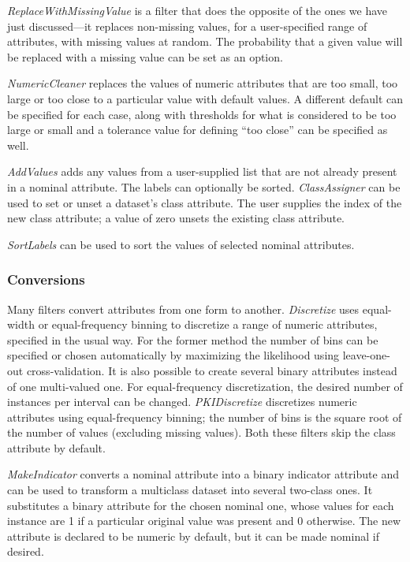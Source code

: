 \textit{ReplaceWithMissingValue} is a filter that does the opposite of
the ones we have just discussed---it replaces non-missing values, for a
user-specified range of attributes, with missing values at random. The
probability that a given value will be replaced with a missing value can
be set as an option.

\textit{NumericCleaner} replaces the values of numeric attributes that are too
small, too large or too close to a particular value with default
values. A different default can be specified for each case, along with
thresholds for what is considered to be too large or small and a
tolerance value for defining ``too close'' can be specified as well.

\textit{AddValues} adds any values from a user-supplied list that are
not already present in a nominal attribute. The labels can optionally
be sorted. \textit{ClassAssigner} can be used to set or unset a
dataset's class attribute. The user supplies the index of the new
class attribute; a value of zero unsets the existing class attribute.

\textit{SortLabels} can be used to sort the values of selected nominal
attributes.

\subsubsection{Conversions}

Many filters convert attributes from one form to another. {\em Discretize}
uses equal-width or equal-frequency binning to discretize a range of
numeric attributes, specified in the usual way. For the former method
the number of bins can be specified or chosen automatically by
maximizing the likelihood using leave-one-out cross-validation. It is
also possible to create several binary attributes instead of one
multi-valued one. For equal-frequency discretization, the desired
number of instances per interval can be
changed. \textit{PKIDiscretize} discretizes numeric attributes using
equal-frequency binning; the number of bins is the square root of the
number of values (excluding missing values). Both these filters skip
the class attribute by default.

\textit{MakeIndicator} converts a nominal attribute into a binary indicator
attribute and can be used to transform a multiclass dataset into
several two-class ones. It substitutes a binary attribute for the
chosen nominal one, whose values for each instance are 1 if a
particular original value was present and 0 otherwise. The new
attribute is declared to be numeric by default, but it can be made
nominal if desired.

